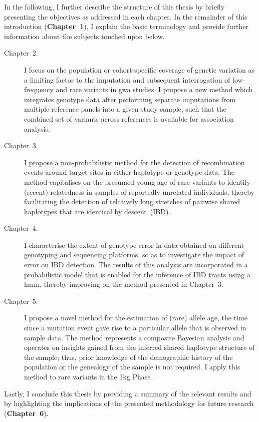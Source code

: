 In the following, I further describe the structure of this thesis by briefly presenting the objectives as addressed in each chapter.
In the remainder of this introduction (\textbf{Chapter~1}), I explain the basic terminology and provide further information about the subjects touched upon below.

\begin{description}
  \item[Chapter~2.] I focus on the population or cohort-specific coverage of genetic variation as a limiting factor to the imputation and subsequent interrogation of low-frequency and rare variants in \gls{gwa} studies.
	I propose a new method which integrates genotype data after performing separate imputations from multiple reference panels into a given study sample, such that the combined set of variants across references is available for association analysis.

  \item[Chapter~3.] I propose a non-probabilistic method for the detection of recombination events around target sites in either haplotype or genotype data.
  The method capitalises on the presumed young age of rare variants to identify (recent) relatedness in samples of reportedly unrelated individuals, thereby facilitating the detection of relatively long stretches of pairwise shared haplotypes that are identical by descent~(IBD).

  \item[Chapter~4.] I characterise the extent of genotype error in data obtained on different genotyping and sequencing platforms, so as to investigate the impact of error on IBD detection.
  The results of this analysis are incorporated in a probabilistic model that is enabled for the inference of IBD tracts using a \gls{hmm}, thereby improving on the method presented in Chapter~3.

  \item[Chapter~5.] I propose a novel method for the estimation of (rare) allele age, \ie the time since a mutation event gave rise to a particular allele that is observed in sample data.
  The method represents a composite Bayesian analysis and operates on insights gained from the inferred shared haplotype structure of the sample; thus, prior knowledge of the demographic history of the population or the genealogy of the sample is not required.
	I apply this method to rare variants in the \gls{1kg} Phase~.
\end{description}

Lastly, I conclude this thesis by providing a summary of the relevant results and by highlighting the implications of the presented methodology for future research (\textbf{Chapter~6}).



